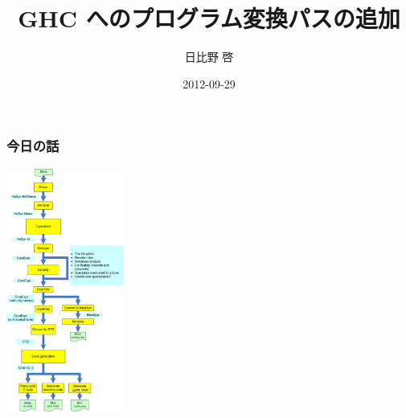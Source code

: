 \documentclass[cjk,dvipdfm,14pt]{beamer}
\title{GHC へのプログラム変換パスの追加}
\author{日比野 啓}
\date{ 2012-09-29 }
\begin{document}
\lstset{language=Haskell,basicstyle=\small\ttfamily}

\begin{frame}

\maketitle

\end{frame}


\begin{frame}[fragile]
\frametitle{今日の話}

\includegraphics[height=8cm]{./HscPipe2.png}

\end{frame}
\end{document}
